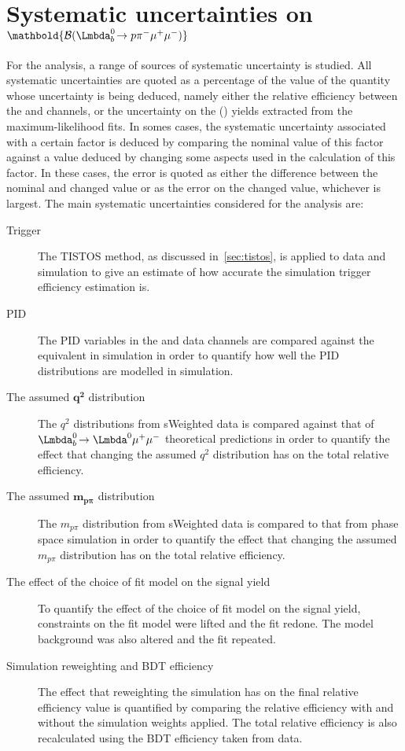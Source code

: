 \section[Systematic uncertainties on $\BF(\Lbpi)$]{Systematic uncertainties on $\mathbold{\BF(\Lbpi)}$}
\label{Sec:Systematics}
For the \Lbpi analysis, a range of sources of systematic uncertainty is studied.  All systematic uncertainties are quoted as a percentage of the value of the quantity whose uncertainty is being deduced, namely either the relative efficiency between the \Lbpi and \Lbpijpsi channels, or the uncertainty on the \Lbpi (\Lbpijpsi) yields extracted from the maximum-likelihood fits. In somes cases, the systematic uncertainty associated with a certain factor is deduced by comparing the nominal value of this factor against a value deduced by changing some aspects used in the calculation of this factor. In these cases, the error is quoted as either the difference between the nominal and changed value or as the error on the changed value, whichever is largest. The main systematic uncertainties considered for the \Lbpi analysis are:

\begin{description}
\item[Trigger] The TISTOS method, as discussed in~\autoref{sec:tistos}, is applied to data and simulation to give an estimate of how accurate the simulation trigger efficiency estimation is.
\item[PID] The PID variables in the \LbKjpsi and \Lbpijpsi data channels are compared against the equivalent in simulation in order to quantify how well the PID distributions are modelled in simulation. %
\item[The assumed $\mathbold{q^{2}}$ distribution] The $q^{2}$ distributions from \LbK sWeighted data is compared against that of $\LbL$ theoretical predictions in order to quantify the effect that changing the assumed $q^{2}$ distribution has on the total relative efficiency.
  \item[The assumed $\mathbold{m_{p\pi}}$ distribution] The $m_{p\pi}$ distribution from \Lbpijpsi sWeighted data is compared to that from phase space \Lbpi simulation in order to quantify the effect that changing the assumed $m_{p\pi}$ distribution has on the total relative efficiency. 
\item[The effect of the choice of fit model on the signal yield] To quantify the effect of the choice of fit model on the signal yield, constraints on the \Lbpi fit model were lifted and the fit redone. The model background was also altered and the fit repeated. %
  \item[Simulation reweighting and BDT efficiency] The effect that reweighting the simulation has on the final relative efficiency value is quantified by comparing the relative efficiency with and without the simulation weights applied. The total relative efficiency is also recalculated using the BDT efficiency taken from \LbK data. 
  \end{description}
